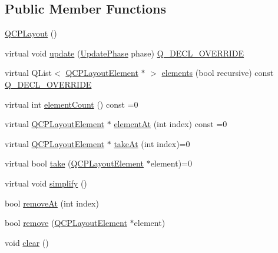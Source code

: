 \subsection*{Public Member Functions}
\begin{DoxyCompactItemize}
\item 
\mbox{\hyperlink{class_q_c_p_layout_a04222e6e1361fd802d48f1a25b7020d4}{Q\+C\+P\+Layout}} ()
\item 
virtual void \mbox{\hyperlink{class_q_c_p_layout_a48ecc9c98ea90b547c3e27a931a8f7bd}{update}} (\mbox{\hyperlink{class_q_c_p_layout_element_a0d83360e05735735aaf6d7983c56374d}{Update\+Phase}} phase) \mbox{\hyperlink{qcustomplot_8h_a42cc5eaeb25b85f8b52d2a4b94c56f55}{Q\+\_\+\+D\+E\+C\+L\+\_\+\+O\+V\+E\+R\+R\+I\+DE}}
\item 
virtual Q\+List$<$ \mbox{\hyperlink{class_q_c_p_layout_element}{Q\+C\+P\+Layout\+Element}} $\ast$ $>$ \mbox{\hyperlink{class_q_c_p_layout_aca129722c019f91d3367046f80abfa77}{elements}} (bool recursive) const \mbox{\hyperlink{qcustomplot_8h_a42cc5eaeb25b85f8b52d2a4b94c56f55}{Q\+\_\+\+D\+E\+C\+L\+\_\+\+O\+V\+E\+R\+R\+I\+DE}}
\item 
virtual int \mbox{\hyperlink{class_q_c_p_layout_a39d3e9ef5d9b82ab1885ba1cb9597e56}{element\+Count}} () const =0
\item 
virtual \mbox{\hyperlink{class_q_c_p_layout_element}{Q\+C\+P\+Layout\+Element}} $\ast$ \mbox{\hyperlink{class_q_c_p_layout_afa73ca7d859f8a3ee5c73c9b353d2a56}{element\+At}} (int index) const =0
\item 
virtual \mbox{\hyperlink{class_q_c_p_layout_element}{Q\+C\+P\+Layout\+Element}} $\ast$ \mbox{\hyperlink{class_q_c_p_layout_a5a79621fa0a6eabb8b520cfc04fb601a}{take\+At}} (int index)=0
\item 
virtual bool \mbox{\hyperlink{class_q_c_p_layout_ada26cd17e56472b0b4d7fbbc96873e4c}{take}} (\mbox{\hyperlink{class_q_c_p_layout_element}{Q\+C\+P\+Layout\+Element}} $\ast$element)=0
\item 
virtual void \mbox{\hyperlink{class_q_c_p_layout_a41e6ac049143866e8f8b4964efab01b2}{simplify}} ()
\item 
bool \mbox{\hyperlink{class_q_c_p_layout_a2403f684fee3ce47132faaeed00bb066}{remove\+At}} (int index)
\item 
bool \mbox{\hyperlink{class_q_c_p_layout_a6c58f537d8086f352576ab7c5b15d0bc}{remove}} (\mbox{\hyperlink{class_q_c_p_layout_element}{Q\+C\+P\+Layout\+Element}} $\ast$element)
\item 
void \mbox{\hyperlink{class_q_c_p_layout_a02883bdf2769b5b227f0232dba1ac4ee}{clear}} ()
\end{DoxyCompactItemize}

